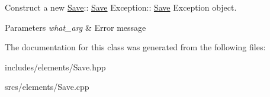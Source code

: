 Construct a new \hyperlink{class_save}{Save}\+:\+: \hyperlink{class_save}{Save} Exception\+:\+: \hyperlink{class_save}{Save} Exception object. 


\begin{DoxyParams}{Parameters}
{\em what\+\_\+arg} & Error message \\
\hline
\end{DoxyParams}


The documentation for this class was generated from the following files\+:\begin{DoxyCompactItemize}
\item 
includes/elements/Save.\+hpp\item 
srcs/elements/Save.\+cpp\end{DoxyCompactItemize}
